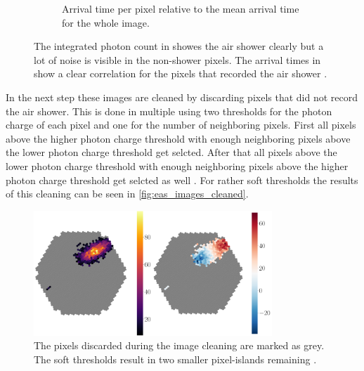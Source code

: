 \begin{figure}
\begin{subfigure}{0.49\textwidth}
        \caption{Arrival time per pixel relative to the mean arrival time for the whole image.}
        \label{fig:eas_image2}
    \end{subfigure}
    \caption{The integrated photon count in  showes the air shower clearly but a lot of noise is visible in the non-shower pixels.
        The arrival times in  show a clear correlation for the pixels that recorded the air shower \cite{lukas}.
    }
    \label{fig:eas_images}
\end{figure}

In the next step these images are cleaned by discarding pixels that did not record the air shower. 
This is done in multiple using two thresholds for the photon charge of each pixel and one for the number of neighboring pixels.
First all pixels above the higher photon charge threshold with enough neighboring pixels above the lower photon charge threshold get selcted.
After that all pixels above the lower photon charge threshold with enough neighboring pixels above the higher photon charge threshold get selcted as well \cite{lukas}.
For rather soft thresholds the results of this cleaning can be seen in \autoref{fig:eas_images_cleaned}.
\begin{figure}
    \centering
    \includegraphics[width=0.8\textwidth]{images/eas_images_cleaned.png}
    \caption{The pixels discarded during the image cleaning are marked as grey. The soft thresholds result in two smaller pixel-islands remaining \cite{lukas}.}
    \label{fig:eas_images_cleaned}
\end{figure}


